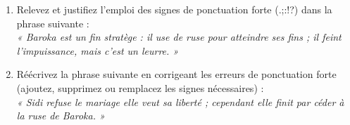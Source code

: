 \documentclass[11pt]{article}
\begin{document}
\begin{exercice}
\begin{enumerate}
    \item Relevez et justifiez l'emploi des signes de ponctuation forte (.;:!?) dans la phrase suivante : \\
    \textit{« Baroka est un fin stratège : il use de ruse pour atteindre ses fins ; il feint l'impuissance, mais c'est un leurre. »}
    \item Réécrivez la phrase suivante en corrigeant les erreurs de ponctuation forte (ajoutez, supprimez ou remplacez les signes nécessaires) : \\
    \textit{« Sidi refuse le mariage elle veut sa liberté ; cependant elle finit par céder à la ruse de Baroka. »}
\end{enumerate}
\end{exercice}
\end{document}
